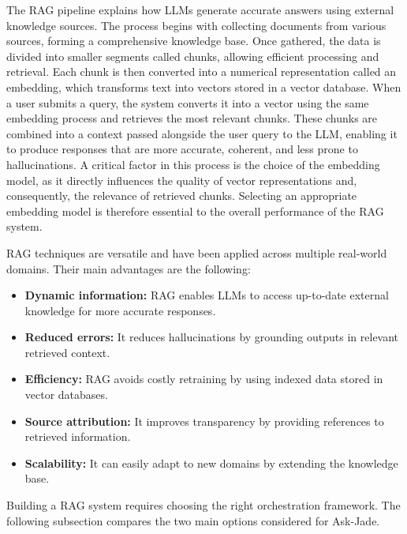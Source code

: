 The RAG pipeline explains how LLMs generate accurate answers using external knowledge sources. The process begins with collecting documents from various sources, forming a comprehensive knowledge base. Once gathered, the data is divided into smaller segments called chunks, allowing efficient processing and retrieval. Each chunk is then converted into a numerical representation called an embedding, which transforms text into vectors stored in a vector database.
When a user submits a query, the system converts it into a vector using the same embedding process and retrieves the most relevant chunks. These chunks are combined into a context passed alongside the user query to the LLM, enabling it to produce responses that are more accurate, coherent, and less prone to hallucinations. A critical factor in this process is the choice of the embedding model, as it directly influences the quality of vector representations and, consequently, the relevance of retrieved chunks. Selecting an appropriate embedding model is therefore essential to the overall performance of the RAG system.



RAG techniques are versatile and have been applied across multiple real-world domains. Their main advantages are the following:

\begin{itemize}
  \item \textbf{Dynamic information:} RAG enables LLMs to access up-to-date external knowledge for more accurate responses.
  
  \item \textbf{Reduced errors:} It reduces hallucinations by grounding outputs in relevant retrieved context.
  
  \item \textbf{Efficiency:} RAG avoids costly retraining by using indexed data stored in vector databases.
  
  \item \textbf{Source attribution:} It improves transparency by providing references to retrieved information.
  
  \item \textbf{Scalability:} It can easily adapt to new domains by extending the knowledge base.
\end{itemize}

Building a RAG system requires choosing the right orchestration framework.
The following subsection compares the two main options considered for
Ask-Jade.

